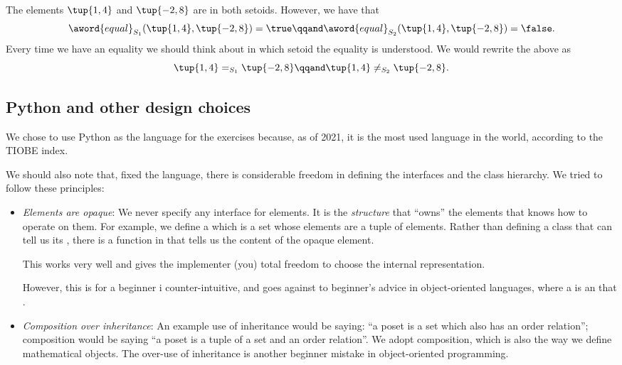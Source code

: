 The elements $\tup{1,4}$ and $\tup{-2, 8}$ are in both setoids.
However, we have that
\begin{equation}
	\aword{equal}_{S_1} (\tup{1,4}, \tup{-2, 8}) = \true
	\qqand
	\aword{equal}_{S_2} (\tup{1,4}, \tup{-2, 8}) = \false .
\end{equation}
Every time we have an equality we should think about in which setoid the equality is understood.
We would rewrite the above as
\begin{equation}
	\tup{1,4} =_{S_1} \tup{-2, 8}
	\qqand
	\tup{1,4} \neq_{S_2} \tup{-2, 8}.
\end{equation}

\subsection{Python and other design choices}

We chose to use Python as the language for the exercises because, as of 2021, it is the most used language in the world, according to the TIOBE index.

We should also note that, fixed the language, there is considerable freedom in defining the interfaces and the class hierarchy.
We tried to follow these principles:
\begin{itemize}
	\item \emph{Elements are opaque}: We never specify any interface for elements.
	      It is the \emph{structure} that ``owns'' the elements that knows how to operate on them.
	      For example, we define a  which is a set whose elements are a tuple of elements.
	      Rather than defining a class  that can tell us its , there is a  function  in  that tells us the content of the opaque element.

	      This works very well and gives the implementer (you) total freedom to choose the internal representation.

	      However, this is for a beginner i counter-intuitive, and goes against to beginner's advice in object-oriented languages, where a  is an  that .

	\item \emph{Composition over inheritance}: An example use of inheritance would be saying: ``a poset is a set which also has an order relation''; composition would be saying ``a poset is a tuple of a set and an order relation''.
	      We adopt composition, which is also the way we define mathematical objects.
	      The over-use of inheritance is another beginner mistake in object-oriented programming.

\end{itemize}

